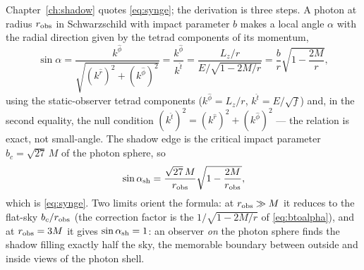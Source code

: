 Chapter~\ref{ch:shadow} quotes \eqref{eq:synge}; the derivation is
three steps. A photon at radius $r_{\rm obs}$ in Schwarzschild with
impact parameter $b$ makes a local angle $\alpha$ with the radial
direction given by the tetrad components of its momentum,
\begin{equation}
\sin\alpha
= \frac{k^{\hat\phi}}{\sqrt{(k^{\hat r})^2 + (k^{\hat\phi})^2}}
= \frac{k^{\hat\phi}}{k^{\hat t}}
= \frac{L_z/r}{E\big/\sqrt{1 - 2M/r}}
= \frac{b}{r}\sqrt{1 - \frac{2M}{r}} ,
\label{eq:syngestep}
\end{equation}
using the static-observer tetrad components
($k^{\hat\phi} = L_z/r$, $k^{\hat t} = E/\sqrt{f}$) and, in the second
equality, the null condition
$(k^{\hat t})^2 = (k^{\hat r})^2 + (k^{\hat\phi})^2$ — the relation is
exact, not small-angle. The shadow edge is the
critical impact parameter $b_c = \sqrt{27}\,M$ of the photon sphere,
so
\begin{equation}
\sin\alpha_{\rm sh} = \frac{\sqrt{27}\,M}{r_{\rm obs}}
\sqrt{1 - \frac{2M}{r_{\rm obs}}} ,
\end{equation}
which is \eqref{eq:synge}. Two limits orient the formula: at
$r_{\rm obs} \gg M$ it reduces to the flat-sky $b_c/r_{\rm obs}$
(the correction factor is the $1/\sqrt{1-2M/r}$ of
\eqref{eq:btoalpha}), and at $r_{\rm obs} = 3M$ it gives
$\sin\alpha_{\rm sh} = 1$: an observer \emph{on} the photon sphere
finds the shadow filling exactly half the sky, the memorable
boundary between outside and inside views of the photon shell.
